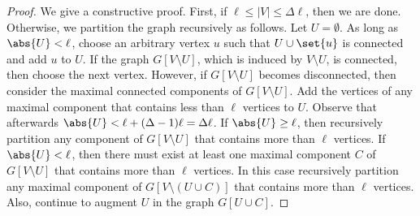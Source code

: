 \begin{proof}
We give a constructive proof.
%
First, if $\ell \leq |V| \leq \Delta \ell$, then we are done.
%
Otherwise, we partition the graph recursively as follows.  Let $U
= \emptyset$.  As long as $\abs{U} < \ell$, choose an arbitrary vertex
$u$ such that $U \cup \set{u}$ is connected and add $u$ to $U$.
%
If the graph $G[V \setminus U]$, which is induced by $V \setminus U$,
is connected, then choose the next vertex.
%
However, if $G[V \setminus U]$ becomes disconnected, then consider the
maximal connected components of $G[V \setminus U]$.  Add the vertices
of any maximal component that contains less than $\ell$ vertices to
$U$.  Observe that afterwards $\abs{U} < \ell + (\Delta-1) \ell
= \Delta \ell$.
%
If $\abs{U} \geq \ell$, then recursively partition any component of
$G[V \setminus U]$ that contains more than $\ell$ vertices.
%
If $\abs{U} < \ell$, then there must exist at least one maximal
component $C$ of $G[V \setminus U]$ that contains more than $\ell$
vertices.  In this case recursively partition any maximal component of
$G[V \setminus (U \cup C)]$ that contains more than $\ell$ vertices.
Also, continue to augment $U$ in the graph $G[U \cup C]$.
\end{proof}


\iffalse %

\begin{proof}
Let $T$ be any spanning tree of $G$ and let $r$ be an arbitrary root.
Starting with $r$, repeatedly choose a child whose subtree is strictly
larger than $\frac{\Delta-1}{\Delta} \abs{V}$, until this is not
possible.  Hence, we have reached a vertex $v$ whose subtree contains
more than $\frac{\Delta-1}{\Delta} \abs{V}$ vertices, but the subtrees
of its children contain at most $\frac{\Delta-1}{\Delta} \abs{V}$
vertices.
%
If $v = r$, then $v$ has a child $u$ with at least $\inv{\Delta}
(\abs{V}-1) \geq \ell$ vertices.  Otherwise, there exists a child $u$
of $v$ whose subtree is of size at least
$\inv{\Delta} \abs{V} \geq \ell$.  Disconnect $u$ and the vertices in
its subtree from the graph.
%
In both cases $u$'s subtree contains at most
$\frac{\Delta-1}{\Delta} \abs{V}$ vertices, and thus at least
$\inv{\Delta} \abs{V} \geq \ell$ vertices remain in the graph.  Hence
we obtain two connected subgraphs of size at least $\ell$.
%
We repeat this procedure recursively on any component of size
strictly larger $\Delta\ell$.
\end{proof}

\fi %


